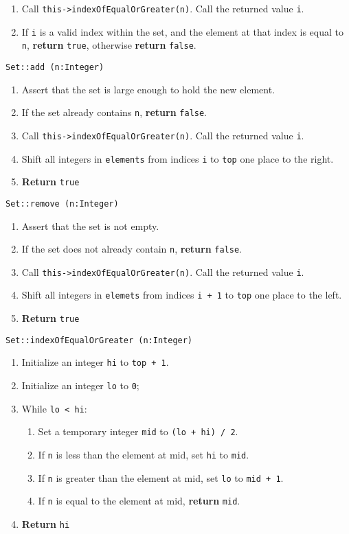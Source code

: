\begin{enumerate}
	\item Call \texttt{this->indexOfEqualOrGreater(n)}. Call the returned value \texttt{i}. 
	\item If \texttt{i} is a valid index within the set, and the element at that index is equal to \texttt{n},
		\textbf{return} \texttt{true}, otherwise \textbf{return} \texttt{false}.
\end{enumerate}
\vspace{5mm}
\texttt{Set::add (n:Integer)}
\begin{enumerate}
	\item Assert that the set is large enough to hold the new element.
	\item If the set already contains \texttt{n}, \textbf{return} \texttt{false}.
	\item Call \texttt{this->indexOfEqualOrGreater(n)}. Call the returned value \texttt{i}. 
	\item Shift all integers in \texttt{elements} from indices \texttt{i} to \texttt{top} one place to the right.
	\item \textbf{Return} \texttt{true} 
\end{enumerate}
\vspace{5mm}
\texttt{Set::remove (n:Integer)}
\begin{enumerate}
	\item Assert that the set is not empty.
	\item If the set does not already contain \texttt{n}, \textbf{return} \texttt{false}.
	\item Call \texttt{this->indexOfEqualOrGreater(n)}. Call the returned value \texttt{i}. 
	\item Shift all integers in \texttt{elemets} from indices \texttt{i + 1} to \texttt{top} one place to the left.
	\item \textbf{Return} \texttt{true} 
\end{enumerate}
\vspace{5mm}
\texttt{Set::indexOfEqualOrGreater (n:Integer)}
\begin{enumerate}
	\item Initialize an integer \texttt{hi} to \texttt{top + 1}.
	\item Initialize an integer \texttt{lo} to \texttt{0};
	\item While \texttt{lo < hi}:
	\begin{enumerate}
		\item Set a temporary integer \texttt{mid} to \texttt{(lo + hi) / 2}.
		\item If \texttt{n} is less than the element at mid, set \texttt{hi} to \texttt{mid}. 
		\item If \texttt{n} is greater than the element at mid, set \texttt{lo} to \texttt{mid + 1}.
		\item If \texttt{n} is equal to the element at mid, \textbf{return} \texttt{mid}.
	\end{enumerate}
	\item \textbf{Return} \texttt{hi}
\end{enumerate}
